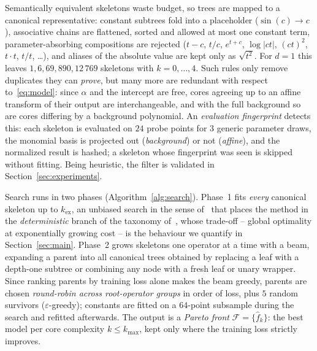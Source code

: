 \documentclass{article}
\begin{document}
Semantically equivalent skeletons waste budget, so trees are mapped to a
canonical representative: constant subtrees fold into a placeholder ($\sin(c)
\to c$), associative chains are flattened, sorted and allowed at most one
constant term, parameter-absorbing compositions are rejected ($t-c$, $t/c$,
$e^{t+c}$, $\log|ct|$, $(ct)^2$, $t\cdot t$, $t/t$, \dots), and aliases of the
absolute value are kept only as $\sqrt{t^2}$. For $d=1$ this leaves $1, 6, 69,
890, 12\,769$ skeletons with $k = 0,\dots,4$. Such rules only remove duplicates
they can \emph{prove}, but many more are redundant with respect
to~\eqref{eq:model}: since $\alpha$ and the intercept are free, cores agreeing
up to an affine transform of their output are interchangeable, and with the full
background so are cores differing by a background polynomial. An
\emph{evaluation fingerprint} detects this: each skeleton is evaluated on $24$
probe points for $3$ generic parameter draws, the monomial basis is projected
out (\emph{background}) or not (\emph{affine}), and the normalized result is
hashed; a skeleton whose fingerprint was seen is skipped without fitting. Being
heuristic, the filter is validated in Section~\ref{sec:experiments}.

Search runs in two phases (Algorithm~\ref{alg:search}). Phase~1 fits
\emph{every} canonical skeleton up to $k_{\mathrm{ex}}$, an unbiased search in
the sense of~\citet{Kahlmeyer} that places the method in the
\emph{deterministic} branch of the taxonomy of~\citet{DongZhongSurvey}, whose
trade-off -- global optimality at exponentially growing cost -- is the behaviour
we quantify in Section~\ref{sec:main}. Phase~2 grows skeletons one operator at a
time with a beam, expanding a parent into all canonical trees obtained by
replacing a leaf with a depth-one subtree or combining any node with a fresh
leaf or unary wrapper. Since ranking parents by training loss alone makes the
beam greedy, parents are chosen \emph{round-robin across root-operator groups}
in order of loss, plus $5$ random survivors ($\varepsilon$-greedy); constants
are fitted on a $64$-point subsample during the search and refitted afterwards.
The output is a \emph{Pareto front} $\mathcal{F} = \{\hat f_k\}$: the best model
per core complexity $k \le k_{\max}$, kept only where the training loss strictly
improves.
\end{document}
